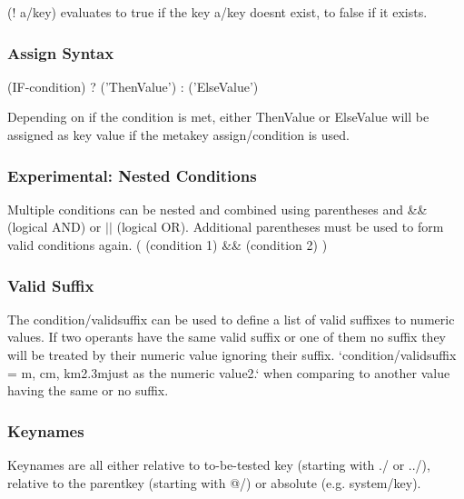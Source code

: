 {\ttfamily (! a/key)} evaluates to true if the key {\ttfamily a/key} doesn\textquotesingle{}t exist, to false if it exists.

\subsubsection*{Assign Syntax}


\begin{DoxyCode}
(IF-condition) ? ('ThenValue') : ('ElseValue')
\end{DoxyCode}


Depending on if the condition is met, either \textquotesingle{}Then\+Value\textquotesingle{} or \textquotesingle{}Else\+Value\textquotesingle{} will be assigned as key value if the metakey {\ttfamily assign/condition} is used.

\subsubsection*{Experimental\+: Nested Conditions}

Multiple conditions can be nested and combined using parentheses and {\ttfamily \&\&} (logical A\+ND) or {\ttfamily $\vert$$\vert$} (logical OR). Additional parentheses must be used to form valid conditions again. {\ttfamily (} {\ttfamily (condition 1) \&\& (condition 2)} {\ttfamily )}

\subsubsection*{Valid Suffix}

The {\ttfamily condition/validsuffix} can be used to define a list of valid suffixes to numeric values. If two operants have the same valid suffix or one of them no suffix they will be treated by their numeric value ignoring their suffix. `condition/validsuffix = \textquotesingle{}m\textquotesingle{}, \textquotesingle{}cm\textquotesingle{}, \textquotesingle{}km2.\+3m{\ttfamily just as the numeric value}2.` when comparing to another value having the same or no suffix.

\subsubsection*{Keynames}

Keynames are all either relative to to-\/be-\/tested key (starting with {\ttfamily ./} or {\ttfamily ../}), relative to the parentkey (starting with {\ttfamily @/}) or absolute (e.\+g. {\ttfamily system/key}).

